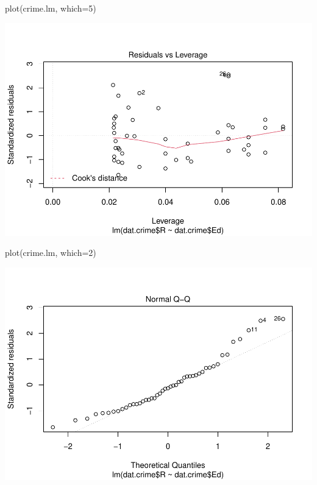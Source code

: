 \documentclass[
]{article}
\newenvironment{Shaded}{\begin{snugshade}}{\end{snugshade}}
\newcommand{\AttributeTok}[1]{\textcolor[rgb]{0.77,0.63,0.00}{#1}}
\newcommand{\DecValTok}[1]{\textcolor[rgb]{0.00,0.00,0.81}{#1}}
\newcommand{\FunctionTok}[1]{\textcolor[rgb]{0.00,0.00,0.00}{#1}}
\newcommand{\NormalTok}[1]{#1}
\begin{document}
\begin{Shaded}
\begin{Highlighting}[]
\FunctionTok{plot}\NormalTok{(crime.lm, }\AttributeTok{which=}\DecValTok{5}\NormalTok{)}
\end{Highlighting}
\end{Shaded}

\includegraphics{Journal_files/figure-latex/unnamed-chunk-39-4.pdf}

\begin{Shaded}
\begin{Highlighting}[]
\FunctionTok{plot}\NormalTok{(crime.lm, }\AttributeTok{which=}\DecValTok{2}\NormalTok{)}
\end{Highlighting}
\end{Shaded}

\includegraphics{Journal_files/figure-latex/unnamed-chunk-39-5.pdf}
\end{document}
